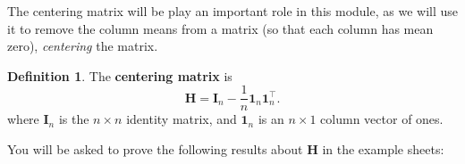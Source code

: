 \documentclass[]{book}
\theoremstyle{definition}
\newtheorem{definition}{Definition}[chapter]
\theoremstyle{definition}
\theoremstyle{definition}
\theoremstyle{remark}
\begin{document}
The centering matrix will be play an important role in this module, as we will use it to remove the column means from a matrix (so that each column has mean zero), \emph{centering} the matrix.

\begin{definition}
\protect\hypertarget{def:centeringmatrix}{}{\label{def:centeringmatrix} }The \textbf{centering matrix} is
\begin{equation}
\boldsymbol H=\mathbf I_n - \frac{1}{n} {\mathbf 1}_n {\mathbf 1}_n^\top.
\label{eq:Hcentre}
\end{equation}
where \(\mathbf I_n\) is the \(n \times n\) identity matrix, and \({\mathbf 1}_n\) is an \(n \times 1\) column vector of ones.
\end{definition}

You will be asked to prove the following results about \(\boldsymbol H\) in the example sheets:
\end{document}
